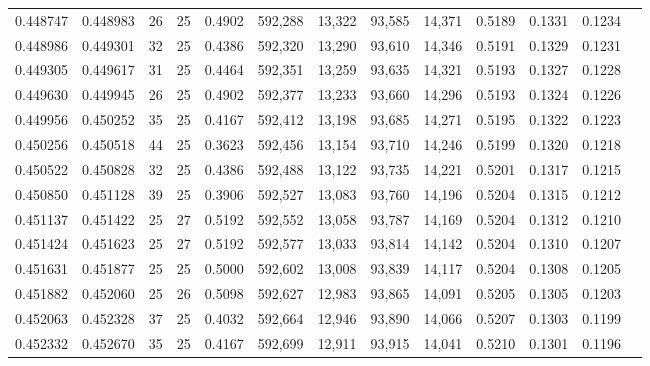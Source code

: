 \begin{tabular}{rrrrrrrrrrrrr}
0.448747 & 0.448983 &    26 &  25 &                                     0.4902 & 592,288 &  13,322 &  93,585 &  14,371 & 0.5189 & 0.1331 & 0.1234 \\
0.448986 & 0.449301 &    32 &  25 &                                     0.4386 & 592,320 &  13,290 &  93,610 &  14,346 & 0.5191 & 0.1329 & 0.1231 \\
0.449305 & 0.449617 &    31 &  25 &                                     0.4464 & 592,351 &  13,259 &  93,635 &  14,321 & 0.5193 & 0.1327 & 0.1228 \\
0.449630 & 0.449945 &    26 &  25 &                                     0.4902 & 592,377 &  13,233 &  93,660 &  14,296 & 0.5193 & 0.1324 & 0.1226 \\
0.449956 & 0.450252 &    35 &  25 &                                     0.4167 & 592,412 &  13,198 &  93,685 &  14,271 & 0.5195 & 0.1322 & 0.1223 \\
0.450256 & 0.450518 &    44 &  25 &                                     0.3623 & 592,456 &  13,154 &  93,710 &  14,246 & 0.5199 & 0.1320 & 0.1218 \\
0.450522 & 0.450828 &    32 &  25 &                                     0.4386 & 592,488 &  13,122 &  93,735 &  14,221 & 0.5201 & 0.1317 & 0.1215 \\
0.450850 & 0.451128 &    39 &  25 &                                     0.3906 & 592,527 &  13,083 &  93,760 &  14,196 & 0.5204 & 0.1315 & 0.1212 \\
0.451137 & 0.451422 &    25 &  27 &                                     0.5192 & 592,552 &  13,058 &  93,787 &  14,169 & 0.5204 & 0.1312 & 0.1210 \\
0.451424 & 0.451623 &    25 &  27 &                                     0.5192 & 592,577 &  13,033 &  93,814 &  14,142 & 0.5204 & 0.1310 & 0.1207 \\
0.451631 & 0.451877 &    25 &  25 &                                     0.5000 & 592,602 &  13,008 &  93,839 &  14,117 & 0.5204 & 0.1308 & 0.1205 \\
0.451882 & 0.452060 &    25 &  26 &                                     0.5098 & 592,627 &  12,983 &  93,865 &  14,091 & 0.5205 & 0.1305 & 0.1203 \\
0.452063 & 0.452328 &    37 &  25 &                                     0.4032 & 592,664 &  12,946 &  93,890 &  14,066 & 0.5207 & 0.1303 & 0.1199 \\
0.452332 & 0.452670 &    35 &  25 &                                     0.4167 & 592,699 &  12,911 &  93,915 &  14,041 & 0.5210 & 0.1301 & 0.1196 \\

\end{tabular}

